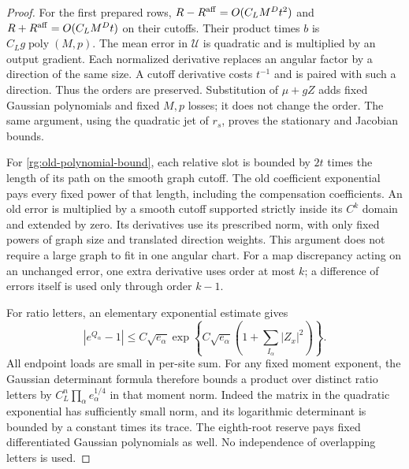 \begin{proof}
For the first prepared rows, $R-R^{\rm aff}=O(C_LM^Dt^2)$ and
$R+R^{\rm aff}=O(C_LM^Dt)$ on their cutoffs.  Their product times
$b$ is $C_Lg\operatorname{poly}(M,p)$.  The mean error in
$\mathcal U$ is quadratic and is multiplied by an output gradient.
Each normalized derivative replaces an angular factor by a direction
of the same size.  A cutoff derivative costs $t^{-1}$ and is paired
with such a direction.  Thus the orders are preserved.  Substitution
of $\mu+gZ$ adds fixed Gaussian polynomials and fixed $M,p$ losses;
it does not change the order.  The same argument, using the
quadratic jet of $r_s$, proves the stationary and Jacobian bounds.

For \eqref{rg:old-polynomial-bound}, each relative slot is bounded
by $2t$ times the length of its path on the smooth graph cutoff.
The old coefficient exponential pays every fixed power of that
length, including the compensation coefficients.  An old error is
multiplied by a smooth cutoff supported strictly inside its $C^k$
domain and extended by zero.  Its derivatives use its prescribed
norm, with only fixed powers of graph size and translated direction
weights.  This argument does not require a large graph to fit in one
angular chart.  For a map discrepancy acting on an unchanged error,
one extra derivative uses order at most $k$; a difference of errors
itself is used only through order $k-1$.

For ratio letters, an elementary exponential estimate gives
\[
 |e^{Q_\alpha}-1|
 \le C\sqrt{e_\alpha}
     \exp\left\{C\sqrt{e_\alpha}
                (1+\sum_{I_\alpha}|Z_x|^2)\right\}.
\]
All endpoint loads are small in per-site sum.  For any fixed moment
exponent, the Gaussian determinant formula therefore bounds a
product over distinct ratio letters by
$C_L^{n}\prod_\alpha e_\alpha^{1/4}$ in that moment norm.
Indeed the matrix in the quadratic exponential has sufficiently
small norm, and its logarithmic determinant is bounded by a constant
times its trace.  The eighth-root reserve pays fixed differentiated
Gaussian polynomials as well.  No independence of overlapping
letters is used.


\end{proof}
